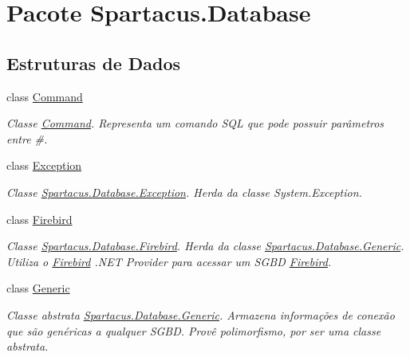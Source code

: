 \hypertarget{namespaceSpartacus_1_1Database}{\section{Pacote Spartacus.\+Database}
\label{namespaceSpartacus_1_1Database}
}
\subsection*{Estruturas de Dados}
\begin{DoxyCompactItemize}
\item 
class \hyperlink{classSpartacus_1_1Database_1_1Command}{Command}
\begin{DoxyCompactList}\small\item\em Classe \hyperlink{classSpartacus_1_1Database_1_1Command}{Command}. Representa um comando S\+Q\+L que pode possuir parâmetros entre \#. \end{DoxyCompactList}\item 
class \hyperlink{classSpartacus_1_1Database_1_1Exception}{Exception}
\begin{DoxyCompactList}\small\item\em Classe \hyperlink{classSpartacus_1_1Database_1_1Exception}{Spartacus.\+Database.\+Exception}. Herda da classe System.\+Exception. \end{DoxyCompactList}\item 
class \hyperlink{classSpartacus_1_1Database_1_1Firebird}{Firebird}
\begin{DoxyCompactList}\small\item\em Classe \hyperlink{classSpartacus_1_1Database_1_1Firebird}{Spartacus.\+Database.\+Firebird}. Herda da classe \hyperlink{classSpartacus_1_1Database_1_1Generic}{Spartacus.\+Database.\+Generic}. Utiliza o \hyperlink{classSpartacus_1_1Database_1_1Firebird}{Firebird} .N\+E\+T Provider para acessar um S\+G\+B\+D \hyperlink{classSpartacus_1_1Database_1_1Firebird}{Firebird}. \end{DoxyCompactList}\item 
class \hyperlink{classSpartacus_1_1Database_1_1Generic}{Generic}
\begin{DoxyCompactList}\small\item\em Classe abstrata \hyperlink{classSpartacus_1_1Database_1_1Generic}{Spartacus.\+Database.\+Generic}. Armazena informações de conexão que são genéricas a qualquer S\+G\+B\+D. Provê polimorfismo, por ser uma classe abstrata. \end{DoxyCompactList}\item 

\end{DoxyCompactItemize}
